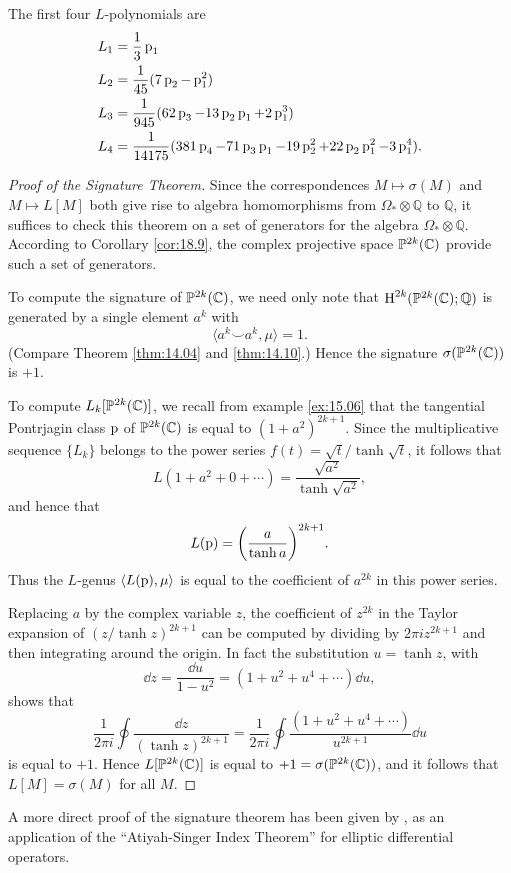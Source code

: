 \documentclass[../main]{subfiles}
\begin{document}
The first four $L$-polynomials are
\[\begin{split}
L_1 &= \frac{1}{3}\operatorname{p}_1 \\
L_2 &= \frac{1}{45}(7\operatorname{p}_2 - \operatorname{p}_1^2) \\
L_3 &= \frac{1}{945}(62\operatorname{p}_3 - 13\operatorname{p}_2\operatorname{p}_1 + 2\operatorname{p}_1^3) \\
L_4 &= \frac{1}{14175}(381\operatorname{p}_4 - 71\operatorname{p}_3\operatorname{p}_1 -19\operatorname{p}_2^2 + 22\operatorname{p}_2\operatorname{p}_1^2 - 3\operatorname{p}_1^4).
\end{split}\]
\begin{proof}[Proof of the Signature Theorem]
Since the correspondences $M \mapsto \sigma(M)$ and \newline $M \mapsto L[M]$ both give rise to algebra homomorphisms from $\Omega_\ast \otimes \mathbb{Q}$ to $\mathbb{Q}$, it suffices to check this theorem on a set of generators for the algebra $\Omega_\ast \otimes \mathbb{Q}$. According to Corollary \ref{cor:18.9}, the complex projective space $\mathbb{P}^{2k}(\mathbb C)$ provide such a set of generators.

To compute the signature of $\mathbb{P}^{2k}(\mathbb C)$, we need only note that $\operatorname{H}^{2k}(\mathbb{P}^{2k}(\mathbb C);\mathbb{Q})$ is generated by a single element $a^k$ with \[\langle a^k \smile a^k, \mu \rangle = 1 .\] (Compare Theorem \ref{thm:14.04} and \ref{thm:14.10}.) Hence the signature $\sigma(\mathbb{P}^{2k}(\mathbb C))$ is $+1$.

To compute $L_k[\mathbb{P}^{2k}(\mathbb C)]$, we recall from example \ref{ex:15.06} that the tangential Pontrjagin class $\operatorname{p}$ of $\mathbb{P}^{2k}(\mathbb C)$ is equal to $(1+a^2)^{2k+1}$. Since the multiplicative sequence $\{L_k\}$ belongs to the power series $f(t) = \sqrt{t}/\tanh \sqrt{t}$, it follows that \[L(1+a^2+0 + \cdots) = \dfrac{\sqrt{a^2}}{\tanh \sqrt{a^2}},\] and hence that \[L(\operatorname{p}) = \biggl(\dfrac{a}{\tanh a}\biggr)^{2k+1}.\] Thus the $L$-genus $\langle L(\operatorname{p}),\mu \rangle$ is equal to the coefficient of $a^{2k}$ in this power series.

Replacing $a$ by the complex variable $z$, the coefficient of $z^{2k}$ in the Taylor expansion of $(z/\tanh z)^{2k+1}$ can be computed by dividing by $2\pi i z^{2k+1}$ and then integrating around the origin. In fact the substitution $u = \tanh z$, with \[\dd z = \frac{\dd u}{1-u^2} = (1+u^2 + u^4 + \cdots)\dd u,\] shows that \[\frac{1}{2\pi i} \oint \frac{\dd z}{(\tanh z)^{2k+1}} = \frac{1}{2\pi i} \oint \frac{(1+u^2 +u^4 + \cdots)}{u^{2k+1}}\dd u\] is equal to $+1$. Hence $L[\mathbb{P}^{2k}(\mathbb C)]$ is equal to $+1 = \sigma(\mathbb{P}^{2k}(\mathbb C))$, and it follows that $L[M] = \sigma(M)$ for all $M$.
\end{proof}
A more direct proof of the signature theorem has been given by \cite[\S6]{atiyah1968}, as an application of the ``Atiyah-Singer Index Theorem'' for elliptic differential operators.
\end{document}
